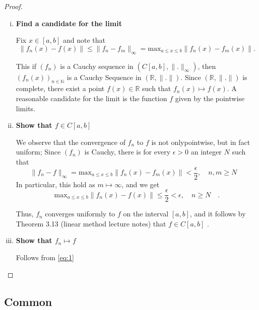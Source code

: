 \documentclass{article}
\theoremstyle{remark}
\begin{document}
\begin{proof}
  \begin{enumerate}[(i)]
    \item \textbf{Find a candidate for the limit}  
    \par  
    Fix $x \in [a,b]$ and note that \[
      \|f_{n}\left( x \right)  - f\left( x \right) \| \le \|f_n - f_m\|_{\infty} = \text{max}_{a \le x \le b } \|f_n\left( x \right) - f_m\left( x \right) \|.
    \] 

    This if $\left( f_n \right) $ is a Cauchy sequence in $\left( C[a,b], \|.\|_{\infty} \right) $, then $\left( f_n\left( x \right)  \right)_{n \in \mathbb{N}} $ is a Cauchy Sequence in $\left( \mathbb{R}, \|.\| \right) $. Since $\left( \mathbb{R}, \|.\| \right) $ is complete, there exist a point $f\left( x \right) \in \mathbb{R}$ such that $f_{n}\left( x \right) \mapsto f\left( x \right) $. A reasonable candidate for the limit is the function $f$ given by the pointwise limits. 

  \item \textbf{Show that $f \in C[a,b]$} 
      \par
      We observe that the convergence of $f_n$ to $f$ is not onlypointwise, but in fact uniform; Since $\left( f_n \right) $ is Cauchy, there is for every $\epsilon > 0 $ an integer $N$ such that \[
        \|f_n - f\|_{\infty} =  \text{max}_{a \le x \le b} \|f_n\left( x \right) -  f_m\left( x \right) \| < \frac{\epsilon}{2}, \quad n,m \ge N \quad  
      \] 
      In particular, this hold as $m \mapsto \infty$, and we get 
      \begin{equation}
      \label{eq:1}
      \text{max}_{a \le x \le b} \|f_n\left( x \right)  - f\left( x \right) \| \le \frac{\epsilon}{2} < \epsilon, \quad n\ge N \quad  
      .\end{equation}

      Thus, $f_n$ converges uniformly to $f$ on the interval $[a,b]$, and it follows by Theorem 3.13 (linear method lecture notes) that $f \in C[a,b]$ .

    \item \textbf{Show that $f_n \mapsto f$} 
        \par
        Follows from \eqref{eq:1} 

  \end{enumerate}
\end{proof}

\subsection{Common}%
\label{sub:common}
\end{document}
